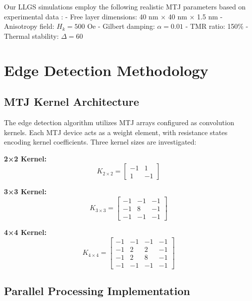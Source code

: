 \documentclass[conference]{IEEEtran}
\begin{document}
Our LLGS simulations employ the following realistic MTJ parameters based on experimental data \cite{b6}:
- Free layer dimensions: 40 nm × 40 nm × 1.5 nm
- Anisotropy field: $H_k = 500$ Oe
- Gilbert damping: $\alpha = 0.01$
- TMR ratio: 150\%
- Thermal stability: $\Delta = 60$

\section{Edge Detection Methodology}

\subsection{MTJ Kernel Architecture}

The edge detection algorithm utilizes MTJ arrays configured as convolution kernels. Each MTJ device acts as a weight element, with resistance states encoding kernel coefficients. Three kernel sizes are investigated:

\textbf{2×2 Kernel:}
\begin{equation}
K_{2×2} = \begin{bmatrix} -1 & 1 \\ 1 & -1 \end{bmatrix}
\label{eq:kernel2x2}
\end{equation}

\textbf{3×3 Kernel:}
\begin{equation}
K_{3×3} = \begin{bmatrix} -1 & -1 & -1 \\ -1 & 8 & -1 \\ -1 & -1 & -1 \end{bmatrix}
\label{eq:kernel3x3}
\end{equation}

\textbf{4×4 Kernel:}
\begin{equation}
K_{4×4} = \begin{bmatrix} -1 & -1 & -1 & -1 \\ -1 & 2 & 2 & -1 \\ -1 & 2 & 8 & -1 \\ -1 & -1 & -1 & -1 \end{bmatrix}
\label{eq:kernel4x4}
\end{equation}

\subsection{Parallel Processing Implementation}
\end{document}
